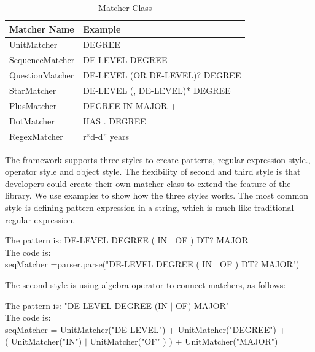 \begin{table}[ht]
\caption{Matcher Class } %
\centering %
\begin{tabular}{  | l |  l |  }
 \hline
 Matcher Name          & Example    \\
 \hline
 UnitMatcher         & DEGREE       \\
 \hline
 SequenceMatcher     & DE-LEVEL DEGREE       \\
  \hline
 QuestionMatcher     & DE-LEVEL (OR DE-LEVEL)?  DEGREE       \\
  \hline
 StarMatcher         & DE-LEVEL (, DE-LEVEL)*  DEGREE       \\
  \hline
 PlusMatcher         & DEGREE IN MAJOR +      \\
  \hline
 DotMatcher          & HAS . DEGREE      \\
  \hline
 RegexMatcher        & r``d-d'' years  \\
  \hline

\end{tabular}
\label{tab:matchers_example} %
\end{table}

The framework supports three styles to create patterns, regular expression style., operator style and  object style. The flexibility of second and third style is that developers could create their own matcher class to extend the feature of the library. We use examples to show how the three styles works. The most common style is defining pattern expression in a string, which is much like traditional regular expression.

\begin{framed}
\small
\noindent
The pattern is:  DE-LEVEL DEGREE ( IN  $\vert$  OF ) DT? MAJOR \\
The code is: \\
seqMatcher =parser.parse("DE-LEVEL DEGREE ( IN  $\vert$  OF ) DT? MAJOR")

\end{framed}

The second style is using algebra operator to connect matchers, as follows:
\begin{framed}
\small
\noindent
The pattern is:  "DE-LEVEL DEGREE (IN $\vert$ OF) MAJOR" \\
The code is: \\
seqMatcher =  UnitMatcher("DE-LEVEL") +  UnitMatcher("DEGREE") + \\
\hspace{3cm} ( UnitMatcher("IN") $\vert$ UnitMatcher("OF" ) ) + UnitMatcher("MAJOR")

\end{framed}

